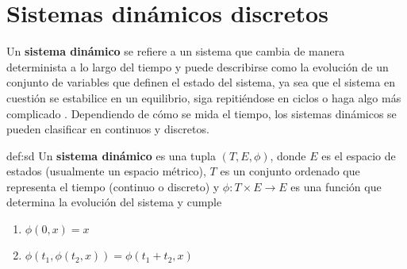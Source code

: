 \documentclass[../Main.tex]{subfiles}
\begin{document}
\section{Sistemas dinámicos discretos}


Un \textbf{sistema dinámico} se refiere a un sistema que cambia de manera determinista a lo largo del tiempo y puede describirse como la evolución de un conjunto de variables que definen el estado del sistema, ya sea que el sistema en cuestión se estabilice en un equilibrio, siga repitiéndose en ciclos o haga algo más complicado \cite{Strogatz2018}. Dependiendo de cómo se mida el tiempo, los sistemas dinámicos se pueden clasificar en continuos y discretos. 

\begin{definition}{}{def:sd}
    Un \textbf{sistema dinámico} es una tupla $(T,E,\phi)$, donde $E$ es el espacio de estados (usualmente un espacio métrico), $T$ es un conjunto ordenado que representa el tiempo (continuo o discreto) y $\phi:T\times E\rightarrow E$ es una función que determina la evolución del sistema y cumple \begin{enumerate}
        \item $\phi(0,x)=x$
        \item $\phi(t_1,\phi(t_2,x))=\phi(t_1+t_2,x)$
    \end{enumerate} 
\end{definition}
\end{document}
